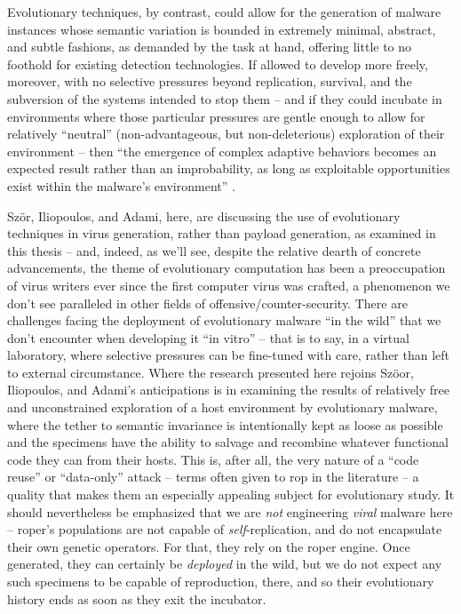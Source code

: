 \documentclass[12pt,glossary]{dalthesis}
\begin{document}
Evolutionary techniques, by contrast, could allow for the generation of malware
instances whose semantic variation is bounded in extremely minimal, abstract,
and subtle fashions, as demanded by the task at hand, offering little to no
foothold for existing detection technologies. If allowed to develop more freely,
moreover, with no selective pressures beyond replication, survival, and the
subversion of the systems intended to stop them -- and if they could incubate
in environments where those particular pressures are gentle enough to allow for
relatively ``neutral'' (non-advantageous, but non-deleterious) exploration of their
environment -- then ``the emergence of complex adaptive behaviors becomes an
expected result rather than an improbability, as long as exploitable opportunities
exist within the malware's environment'' \cite{iliopoulos11}.

Sz\"{o}r, Iliopoulos, and Adami, here, are discussing the use of evolutionary
techniques in virus generation, rather than payload generation, as examined
in this thesis -- and, indeed, as we'll see, despite the relative dearth of concrete
advancements, the theme of evolutionary computation has been a preoccupation
of virus writers ever since the first computer virus was crafted, a phenomenon
we don't see paralleled in other fields of offensive/counter-security. There
are challenges facing the deployment of evolutionary malware ``in the wild'' that
we don't encounter when developing it ``in vitro'' -- that is to say, in a virtual
laboratory, where selective pressures can be fine-tuned with care, rather than
left to external circumstance. Where the research presented here rejoins
Sz\"{o}or, Iliopoulos, and Adami's anticipations is in examining the results of
relatively free and unconstrained exploration of a host environment by
evolutionary malware, where the tether to semantic invariance is intentionally
kept as loose as possible and the specimens have the ability to salvage and
recombine whatever functional code they can from their hosts. This is, after
all, the very nature of a ``code reuse'' or ``data-only'' attack -- terms often
given to \gls{rop} in the literature -- a quality that makes them an especially
appealing subject for evolutionary study. It should nevertheless be emphasized
that we are \emph{not} engineering \emph{viral} malware here -- \gls{roper}'s populations
are not capable of \emph{self}-replication, and do not encapsulate their own genetic
operators. For that, they rely on the \gls{roper} engine. Once generated, they
can certainly be \emph{deployed} in the wild, but we do not expect any such specimens
to be capable of reproduction, there, and so their evolutionary history ends
as soon as they exit the incubator.
\end{document}

